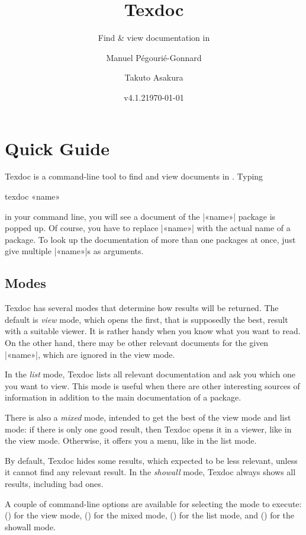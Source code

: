 \documentclass{texdoc-doc}
\title{Texdoc}
\subtitle{Find \& view documentation in \TL}
\author{Manuel Pégourié-Gonnard\and Takuto Asakura}
\date{v4.1.2\quad \today}
\begin{document}
\VerbatimFootnotes

\maketitle

\section{Quick Guide}

Texdoc is a command-line tool to find and view documents in {\TL}. Typing
%
\begin{htcode}
texdoc «name»
\end{htcode}
%
in your command line, you will see a document of the |«name»| package is popped
up. Of course, you have to replace |«name»| with the actual name of a package.
To look up the documentation of more than one packages at once, just give
multiple |«name»|s as arguments.

\subsection{Modes}
\label{sec:modes}

Texdoc has several modes that determine how results will be returned. The
default is \emph{view} mode, which opens the first, that is supposedly the
best, result with a suitable viewer. It is rather handy when you know what you
want to read. On the other hand, there may be other relevant documents for the
given |«name»|, which are ignored in the view mode.

In the \emph{list} mode, Texdoc lists all relevant documentation and ask you
which one you want to view. This mode is useful when there are other
interesting sources of information in addition to the main documentation of a
package.

There is also a \emph{mixed} mode, intended to get the best of the view mode
and list mode: if there is only one good result, then Texdoc opens it in a
viewer, like in the view mode. Otherwise, it offers you a menu, like in the
list mode.

By default, Texdoc hides some results, which expected to be less relevant,
unless it cannot find any relevant result. In the \emph{showall} mode, Texdoc
always shows all results, including bad ones.

A couple of command-line options are available for selecting the mode to
execute:  () for the view mode,  () for
the mixed mode,  () for the list mode, and 
() for the showall mode.
\end{document}
